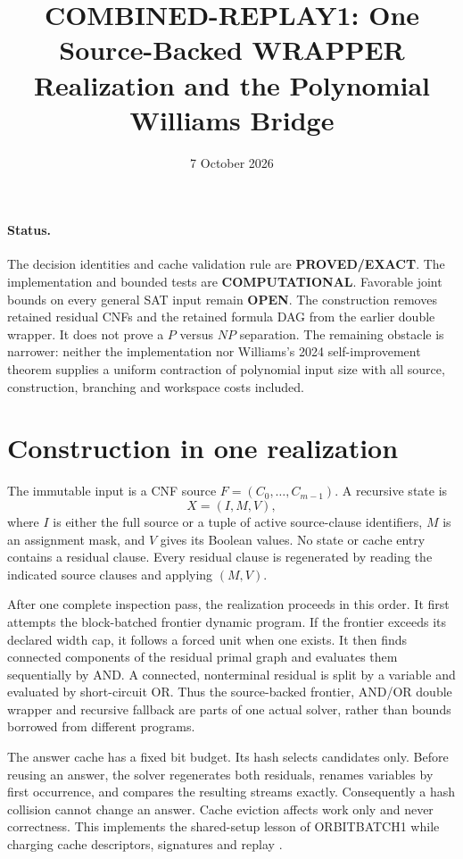 \documentclass[11pt]{article}
\title{COMBINED-REPLAY1: One Source-Backed WRAPPER Realization and the Polynomial Williams Bridge}
\date{7 October 2026}
\begin{document}
\maketitle

\paragraph{Status.}
The decision identities and cache validation rule are
\textbf{PROVED/EXACT}.  The implementation and bounded tests are
\textbf{COMPUTATIONAL}.  Favorable joint bounds on every general SAT input
remain \textbf{OPEN}.
The construction removes retained residual CNFs and the retained formula DAG
from the earlier double wrapper.  It does not prove a $P$ versus $NP$
separation.  The remaining obstacle is narrower: neither the implementation
nor Williams's 2024 self-improvement theorem supplies a uniform contraction
of polynomial input size with all source, construction, branching and
workspace costs included.

\section{Construction in one realization}
The immutable input is a CNF source $F=(C_0,\ldots,C_{m-1})$.  A recursive
state is
\[
  X=(I,M,V),
\]
where $I$ is either the full source or a tuple of active source-clause
identifiers, $M$ is an assignment mask, and $V$ gives its Boolean values.
No state or cache entry contains a residual clause.  Every residual clause is
regenerated by reading the indicated source clauses and applying $(M,V)$.

After one complete inspection pass, the realization proceeds in this order.
It first attempts the block-batched frontier dynamic program.  If the frontier
exceeds its declared width cap, it follows a forced unit when one exists.  It
then finds connected components of the residual primal graph and evaluates
them sequentially by AND.  A connected, nonterminal residual is split by a
variable and evaluated by short-circuit OR.  Thus the source-backed frontier,
AND/OR double wrapper and recursive fallback are parts of one actual solver,
rather than bounds borrowed from different programs.

The answer cache has a fixed bit budget.  Its hash selects candidates only.
Before reusing an answer, the solver regenerates both residuals, renames
variables by first occurrence, and compares the resulting streams exactly.
Consequently a hash collision cannot change an answer.  Cache eviction affects
work only and never correctness.  This implements the shared-setup lesson of
ORBITBATCH1 while charging cache descriptors, signatures and replay
\cite{orbitbatch1}.
\end{document}
